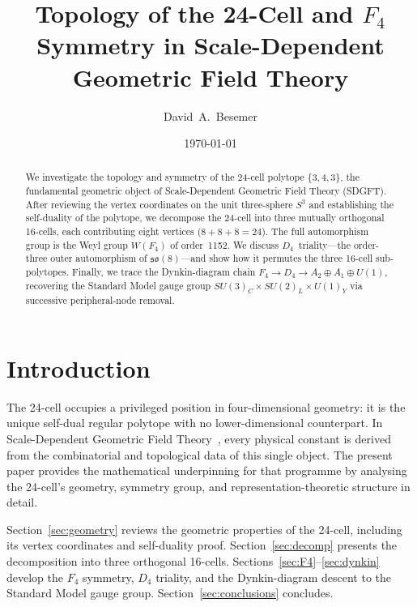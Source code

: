 \documentclass[amsmath,amssymb,aps,prd,twocolumn,superscriptaddress,nofootinbib]{revtex4-2}
\begin{document}

\title{Topology of the 24-Cell and $F_4$ Symmetry in Scale-Dependent
       Geometric Field Theory}

\author{David~A.~Besemer}
\date{\today}

\begin{abstract}
We investigate the topology and symmetry of the 24-cell polytope
$\{3,4,3\}$, the fundamental geometric object of Scale-Dependent Geometric
Field Theory (SDGFT).  After reviewing the vertex coordinates on the unit
three-sphere $S^3$ and establishing the self-duality of the polytope, we
decompose the 24-cell into three mutually orthogonal 16-cells, each
contributing eight vertices ($8+8+8=24$).  The full automorphism group is the
Weyl group $W(F_4)$ of order~1152.  We discuss $D_4$~triality---the
order-three outer automorphism of $\mathfrak{so}(8)$---and show how it
permutes the three 16-cell sub-polytopes.  Finally, we trace the Dynkin-diagram
chain $F_4 \to D_4 \to A_2 \oplus A_1 \oplus U(1)$, recovering the Standard
Model gauge group $SU(3)_C \times SU(2)_L \times U(1)_Y$ via successive
peripheral-node removal.
\end{abstract}

\maketitle

\section{Introduction}\label{sec:intro}

The 24-cell occupies a privileged position in four-dimensional geometry: it is
the unique self-dual regular polytope with no lower-dimensional counterpart.
In Scale-Dependent Geometric Field Theory~\cite{Besemer2026_01}, every physical
constant is derived from the combinatorial and topological data of this single
object.  The present paper provides the mathematical underpinning for that
programme by analysing the 24-cell's geometry, symmetry group, and
representation-theoretic structure in detail.

Section~\ref{sec:geometry} reviews the geometric properties of the 24-cell,
including its vertex coordinates and self-duality proof.
Section~\ref{sec:decomp} presents the decomposition into three orthogonal
16-cells.  Sections~\ref{sec:F4}--\ref{sec:dynkin} develop the $F_4$ symmetry,
$D_4$ triality, and the Dynkin-diagram descent to the Standard Model gauge
group.  Section~\ref{sec:conclusions} concludes.
\end{document}
